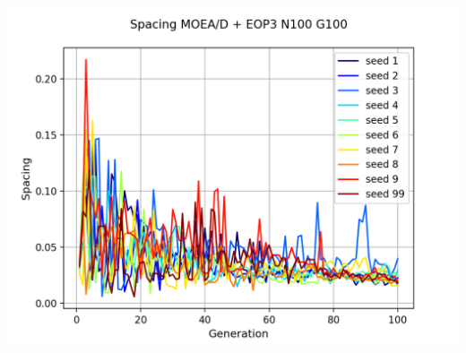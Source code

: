 \begin{center}
\includegraphics[scale=0.5]{figures/METRICS_EOP3/Spacing_N100_G100.png}\\
\end{center}


